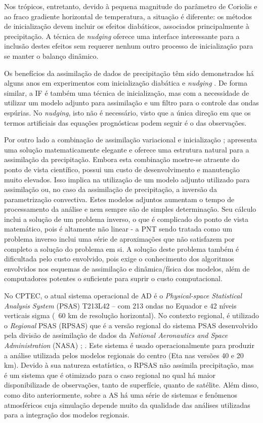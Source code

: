 Nos trópicos, entretanto, devido à pequena magnitude do parâmetro de Coriolis e ao fraco gradiente horizontal de temperatura, a situação é diferente: os métodos de inicialização devem incluir os efeitos diabáticos, associados principalmente à precipitação. A técnica de \textit{nudging} oferece uma interface interessante para a inclusão destes efeitos sem requerer nenhum outro processo de inicialização para se manter o balanço dinâmico.

Os benefícios da assimilação de dados de precipitação têm sido demonstrados há alguns anos em experimentos com inicialização diabática e \textit{nudging} \cite{zupanskimesinger95}. De forma similar, a IF é também uma técnica de inicialização, mas com a necessidade de utilizar um modelo adjunto para assimilação e um filtro para o controle das ondas espúrias. No \textit{nudging}, isto não é necessário, visto que a única direção em que os termos artificiais das equações prognósticas podem seguir é o das observações.

Por outro lado a combinação de assimilação variacional e inicialização \cite{zupanskimesinger95}; \cite{treadon96} apresenta uma solução matematicamente elegante e oferece uma estrutura natural para a assimilação da precipitação. Embora esta combinação mostre-se atraente do ponto de vista científico, possui um custo de desenvolvimento e manutenção muito elevados. Isso implica na utilização de um modelo adjunto utilizado para assimilação ou, no caso da assimilação de precipitação, a inversão da parametrização convectiva. Estes modelos adjuntos aumentam o tempo de processamento da análise e nem sempre são de simples determinação. Seu cálculo inclui a solução de um problema inverso, o que é complicado do ponto de vista matemático, pois é altamente não linear - a  PNT sendo tratada como um problema inverso inclui uma série de aproximações que não satisfazem por completo a solução do problema em si. A solução deste problema também é dificultada pelo custo envolvido, pois exige o conhecimento dos algoritmos envolvidos nos esquemas de assimilação e dinâmica/física dos modelos, além de computadores potentes o suficiente para suprir o custo computacional.

No CPTEC, o atual sistema operacional de AD é o \textit{Physical-space Statistical Analysis System} (PSAS) T213L42 – com 213 ondas no Equador e 42 níveis verticais sigma (~60 km de resolução horizontal). No contexto regional, é utilizado o \textit{Regional} PSAS (RPSAS) que é a versão regional do sistema PSAS desenvolvido pela divisão de assimilação de dados da \textit{National Aeronautics and Space Administration} (NASA) \cite{dasilvaetal95}; \cite{courtier97}. Este sistema é usado operacionalmente para produzir a análise utilizada pelos modelos regionais do centro (Eta nas versões 40 e 20 km). Devido à sua natureza estatística, o RPSAS não assimila precipitação, mas é um sistema que é otimizado para o caso regional no qual há maior disponibilizade de observações, tanto de superfície, quanto de satélite. Além disso, como dito anteriormente, sobre a AS há uma série de sistemas e fenômenos atmosféricos cuja simulação depende muito da qualidade das análises utilizadas para a integração dos modelos regionais.

